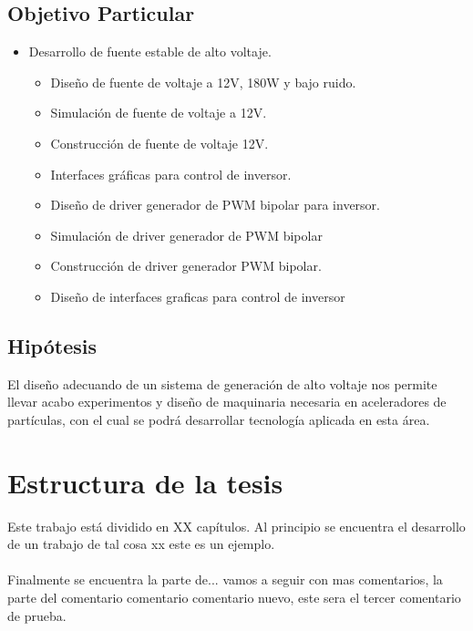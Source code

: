 \subsection{Objetivo Particular}


\begin{itemize}
\item Desarrollo de fuente estable de alto voltaje.
\begin{itemize}
\item Diseño de fuente de voltaje a 12V, 180W y bajo ruido.
\item Simulación de fuente de voltaje a 12V.
\item Construcción de fuente de voltaje 12V.
\item Interfaces gráficas para control de inversor.
\item Diseño de driver generador de PWM bipolar para inversor.
\item Simulación de driver generador de PWM bipolar
\item Construcción de driver generador PWM bipolar.
\item Diseño de interfaces graficas para control de inversor
\end{itemize}  
\end{itemize}

\subsection{Hipótesis}
El diseño adecuando de un sistema de generación de alto voltaje nos permite llevar acabo experimentos y diseño de maquinaria necesaria en aceleradores de partículas, con el cual se podrá desarrollar tecnología aplicada en esta área.


\section{Estructura de la tesis}

Este trabajo está dividido en XX capítulos. Al principio se encuentra el desarrollo de un trabajo de tal cosa xx este es un ejemplo.
\\\\
Finalmente se encuentra la parte de... vamos a seguir con mas comentarios, la parte del comentario comentario comentario nuevo, este sera el tercer comentario de prueba.